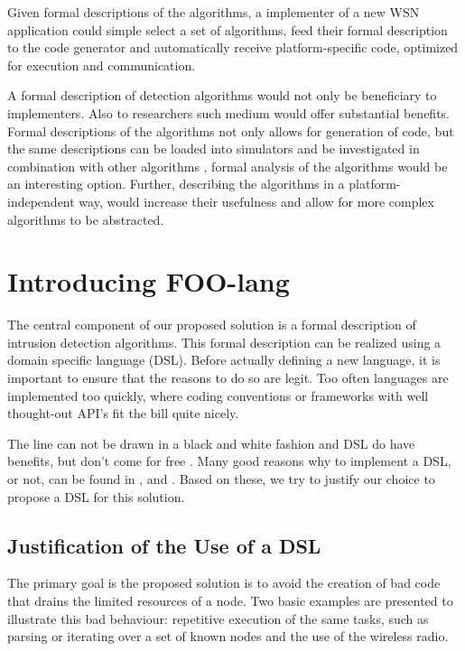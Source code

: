 \documentclass[conference]{IEEEtran}
\begin{document}
Given formal descriptions of the algorithms, a implementer of a new WSN
application could simple select a set of algorithms, feed their formal
description to the code generator and automatically receive platform-specific
code, optimized for execution and communication.

A formal description of detection algorithms would not only be beneficiary to
implementers. Also to researchers such medium would offer substantial benefits.
Formal descriptions of the algorithms not only allows for generation of code,
but the same descriptions can be loaded into simulators and be investigated in
combination with other algorithms \cite{mernik2005and}, formal analysis of the
algorithms would be an interesting option. Further, describing the algorithms
in a platform-independent way, would increase their usefulness and allow for
more complex algorithms to be abstracted.

\section{Introducing FOO-lang}
\label{section:foo-lang}

The central component of our proposed solution is a formal description of
intrusion detection algorithms. This formal description can be realized using a
domain specific language (DSL). Before actually defining a new language, it is
important to ensure that the reasons to do so are legit. Too often languages
are implemented too quickly, where coding conventions or frameworks with well
thought-out API's fit the bill quite nicely.

The line can not be drawn in a black and white fashion and DSL do have
benefits, but don't come for free \cite{mernik2005and}. Many good reasons why
to implement a DSL, or not, can be found in \cite{van2000domain},
\cite{mernik2005and} and \cite{fowler2010domain}. Based on these, we try to
justify our choice to propose a DSL for this solution.

\subsection{Justification of the Use of a DSL}
\label{subsection:justification}

The primary goal is the proposed solution is to avoid the creation of bad code
that drains the limited resources of a node. Two basic examples are presented
to illustrate this bad behaviour: repetitive execution of the same tasks, such
as parsing or iterating over a set of known nodes and the use of the wireless
radio.
\end{document}

